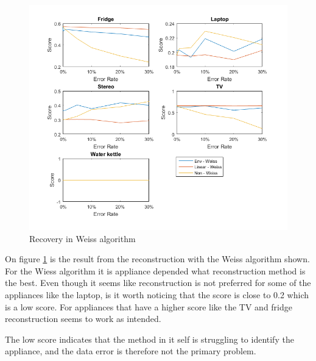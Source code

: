 \newpage
\begin{figure}[H]
\centering
\includegraphics[width=1\textwidth]{billeder/Rec-Weiss.png}
\caption{Recovery in Weiss algorithm}
\label{fig:ERWEISS}
\end{figure}

On figure \ref{fig:ERWEISS} is the result from the reconstruction with the Weiss algorithm shown. For the Wiess algorithm it is appliance depended what reconstruction method is the best. Even though it seems like reconstruction is not preferred for some of the appliances like the laptop, is it worth noticing that the score is close to 0.2 which is a low score. For appliances that have a higher score like the TV and fridge reconstruction seems to work as intended.

The low score indicates that the method in it self is struggling to identify the appliance, and the data error is therefore not the primary problem.  